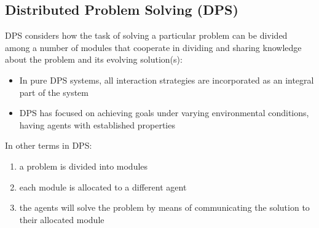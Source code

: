 \subsection{Distributed Problem Solving (DPS)}
DPS considers how the task of solving a particular problem can be divided among a number of modules that cooperate in dividing and sharing knowledge about the problem and its evolving solution(s):
\begin{itemize}
\item In pure DPS systems, all interaction strategies are incorporated as an integral part of the system
\item DPS has focused on achieving goals under varying environmental conditions, having agents with established properties
\end{itemize}

In other terms in DPS:
\begin{enumerate}
\item a problem is divided into modules 
\item each module is allocated to a different agent
\item the agents will solve the problem by means of communicating the solution to their allocated module
\end{enumerate}


